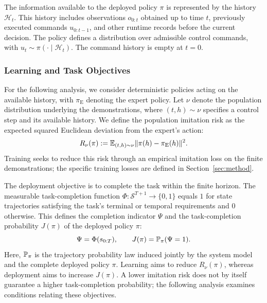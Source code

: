 The information available to the deployed policy $\pi$ is represented by the history $\mathcal H_t$.
This history includes observations $o_{0:t}$ obtained up to time $t$, previously executed commands $u_{0:t-1}$, 
and other runtime records before the current decision.
The policy defines a distribution over admissible control commands,
with $u_t\sim\pi(\cdot\mid\mathcal H_t)$.
The command history is empty at $t=0$.

\subsubsection{Learning and Task Objectives}
For the following analysis, we consider deterministic policies acting on the available history,
with $\pi_{\mathrm E}$ denoting the expert policy.
Let $\nu$ denote the population distribution underlying the demonstrations,
where $(t,h)\sim\nu$ specifies a control step and its available history.
We define the population imitation risk as the expected squared
Euclidean deviation from the expert's action:
\begin{equation}
 R_\nu(\pi)
 :=\mathbb E_{(t,h)\sim\nu}\lVert\pi(h)-\pi_{\mathrm E}(h)\rVert^2.
 \label{eq:populationimitationrisk}
\end{equation}
Training seeks to reduce this risk through an empirical imitation loss
on the finite demonstrations; the specific training losses are defined in Section~\ref{sec:method}.

The deployment objective is to complete the task within the finite horizon.
The measurable task-completion function $\Phi:\mathcal S^{T+1}\to\{0,1\}$ equals $1$
for state trajectories satisfying the task's terminal or temporal requirements and $0$ otherwise.
This defines the completion indicator $\Psi$ and the task-completion probability $J(\pi)$ of the deployed policy $\pi$:
\begin{equation}
 \Psi=\Phi(s_{0:T}),\qquad
 J(\pi)=\mathbb P_\pi(\Psi=1).
 \label{eq:visualtask}
\end{equation}
Here, $\mathbb P_\pi$ is the trajectory probability law induced jointly by the system model
and the complete deployed policy $\pi$.
Learning aims to reduce $R_\nu(\pi)$, whereas deployment aims to increase $J(\pi)$.
A lower imitation risk does not by itself guarantee a higher task-completion probability;
the following analysis examines conditions relating these objectives.


